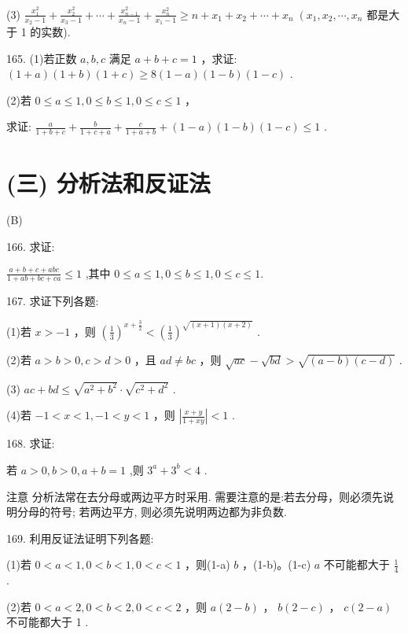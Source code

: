 \documentclass[10pt]{article}
\begin{document}
(3) \(\frac{{x}_{1}^{2}}{{x}_{2} - 1} + \frac{{x}_{2}^{2}}{{x}_{3} - 1} + \cdots  + \frac{{x}_{n - 1}^{2}}{{x}_{n} - 1} + \frac{{x}_{n}^{2}}{{x}_{1} - 1} \geq  n + {x}_{1} + {x}_{2} + \cdots  + {x}_{n}\;\left( {{x}_{1},{x}_{2},\cdots ,{x}_{n}}\right.\) 都是大于 1 的实数).

165. (1)若正数 \(a,b,c\) 满足 \(a + b + c = 1\) ，求证: \(\left( {1 + a}\right) \left( {1 + b}\right) \left( {1 + c}\right)  \geq  8\left( {1 - a}\right) \left( {1 - b}\right) \left( {1 - c}\right)\) .

(2)若 \(0 \leq  a \leq  1,0 \leq  b \leq  1,0 \leq  c \leq  1\) ，

求证: \(\frac{a}{1 + b + c} + \frac{b}{1 + c + a} + \frac{c}{1 + a + b} + \left( {1 - a}\right) \left( {1 - b}\right) \left( {1 - c}\right)  \leq  1\) .

\section*{(三) 分析法和反证法}

(B)

166. 求证:

\(\frac{a + b + c + {abc}}{1 + {ab} + {bc} + {ca}} \leq  1\) ,其中 \(0 \leq  a \leq  1,0 \leq  b \leq  1,0 \leq  c \leq  1.\)

167. 求证下列各题:

(1)若 \(x >  - 1\) ，则 \({\left( \frac{1}{3}\right) }^{x + \frac{3}{2}} < {\left( \frac{1}{3}\right) }^{\sqrt{\left( {x + 1}\right) \left( {x + 2}\right) }}\) .

(2)若 \(a > b > 0,c > d > 0\) ，且 \({ad} \neq  {bc}\) ，则 \(\sqrt{ac} - \sqrt{bd} > \sqrt{\left( {a - b}\right) \left( {c - d}\right) }\) .

(3) \({ac} + {bd} \leq  \sqrt{{a}^{2} + {b}^{2}} \cdot  \sqrt{{c}^{2} + {d}^{2}}\) .

(4)若 \(- 1 < x < 1, - 1 < y < 1\) ，则 \(\left| \frac{x + y}{1 + {xy}}\right|  < 1\) .

168. 求证:

若 \(a > 0,b > 0,a + b = 1\) ,则 \({3}^{a} + {3}^{b} < 4\) .

注意 分析法常在去分母或两边平方时采用. 需要注意的是:若去分母，则必须先说明分母的符号; 若两边平方, 则必须先说明两边都为非负数.

169. 利用反证法证明下列各题:

(1)若 \(0 < a < 1,0 < b < 1,0 < c < 1\) ，则(1-a) \(b\) ，(1-b)。(1-c) \(a\) 不可能都大于 \(\frac{1}{4}\) .

(2)若 \(0 < a < 2,0 < b < 2,0 < c < 2\) ，则 \(a\left( {2 - b}\right)\) ， \(b\left( {2 - c}\right)\) ， \(c\left( {2 - a}\right)\) 不可能都大于 1 .
\end{document}
